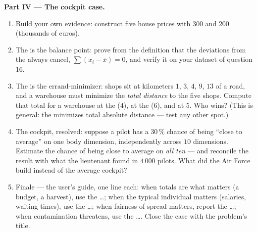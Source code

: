\begin{problem}
\medskip
\noindent\textbf{Part IV --- The cockpit case.}
\begin{enumerate}[resume]
  \item Build your own evidence: construct five house prices
        with  $300$ and  $200$ (thousands of euros).
  \item The  is the balance point: prove from the definition
        that the deviations from the  always cancel,
        $\sum (x_i - \bar x) = 0$, and verify it on your dataset
        of question 16.
  \item The  is the errand-minimizer: shops sit at
        kilometers $1$, $3$, $4$, $9$, $13$ of a road, and a
        warehouse must minimize the \emph{total distance} to the
        five shops. Compute that total for a warehouse at the
         ($4$), at the  ($6$), and at $5$. Who wins?
        (This is general: the  minimizes total absolute
        distance --- test any other spot.)
  \item The cockpit, resolved: suppose a pilot has a $30\,\%$
        chance of being ``close to average'' on one body
        dimension, independently across $10$ dimensions.
        Estimate the chance of being close to average on
        \emph{all ten} --- and reconcile the result with what the
        lieutenant found in $4\,000$ pilots. What did the Air
        Force build instead of the average cockpit?
  \item Finale --- the user's guide, one line each: when totals
        are what matters (a budget, a harvest), use the \dots;
        when the typical individual matters (salaries, waiting
        times), use the \dots; when fairness of spread matters,
        report the \dots; when contamination threatens, use the
        \dots. Close the case with the problem's title.
\end{enumerate}
\end{problem}
